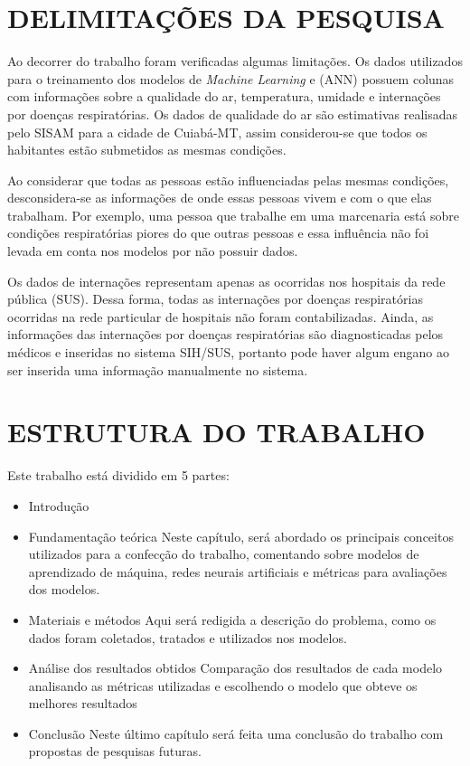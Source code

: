 \documentclass[
  12pt,		%
  a4paper,	%
  openright,%
  oneside,	%
  chapter=TITLE,		%
  section=TITLE,		%
  english,	%
  french,	%
  spanish,	%
  brazil	%
]{abntex2}
\begin{document}
    \section{DELIMITAÇÕES DA PESQUISA}
    Ao decorrer do trabalho foram verificadas algumas limitações.
    Os dados utilizados para o treinamento dos modelos de \textit{Machine Learning} e (ANN) possuem 
    colunas com informações sobre a qualidade do ar, temperatura, umidade e internações por doenças respiratórias. Os dados de qualidade
    do ar são estimativas realisadas pelo SISAM para a cidade de Cuiabá-MT, assim considerou-se que todos os habitantes 
    estão submetidos as mesmas condições.

    Ao considerar que todas as pessoas estão influenciadas pelas mesmas condições, desconsidera-se 
    as informações de onde essas pessoas vivem e com o que elas trabalham. Por exemplo, uma pessoa que trabalhe em uma marcenaria
    está sobre condições respiratórias piores do que outras pessoas e essa influência não foi levada em conta nos modelos por não possuir dados.

    Os dados de internações representam apenas as ocorridas nos hospitais da rede pública (SUS). Dessa forma, todas as internações
    por doenças respiratórias ocorridas na rede particular de hospitais não foram contabilizadas. Ainda, as informações das internações por doenças 
    respiratórias são diagnosticadas pelos médicos e inseridas no sistema SIH/SUS, portanto pode haver algum engano ao ser inserida uma informação
    manualmente no sistema.

    \section{ESTRUTURA DO TRABALHO}

    Este trabalho está dividido em 5 partes: 
    
    \begin{itemize}
        \item Introdução
        \item Fundamentação teórica
            \subitem Neste capítulo, será abordado os principais conceitos utilizados para a confecção do trabalho, 
            comentando sobre modelos de aprendizado de máquina, redes neurais artificiais e métricas
            para avaliações dos modelos.
        \item Materiais e métodos
            \subitem Aqui será redigida a descrição do problema, como os dados foram coletados, tratados
            e utilizados nos modelos.
        \item Análise dos resultados obtidos
            \subitem Comparação dos resultados de cada modelo analisando as métricas utilizadas e escolhendo o modelo que obteve os melhores resultados
        \item Conclusão
            \subitem Neste último capítulo será feita uma conclusão do trabalho com propostas de pesquisas futuras.
    \end{itemize}
\end{document}
